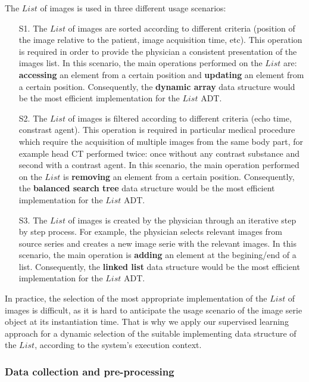 The $List$ of images is used in three different usage scenarios:

\begin{enumerate}

\item [S1.] The $List$ of images are sorted according to different criteria (position of the image relative to the patient, image acquisition time, etc). This operation is required in order to provide the physician a consistent presentation of the images list. In this scenario, the main operations performed on the $List$ are: \textbf{accessing} an element from a certain position and \textbf{updating} an element from a certain position. Consequently, the \textbf{dynamic array} data structure would be the most efficient implementation for the $List$ ADT.

\item [S2.] The $List$ of images is filtered according to different criteria (echo time, constrast agent). This operation is required in particular medical procedure which require the acquisition of multiple images from the same body part, for example head CT performed twice: once without any contrast substance and second with a contrast agent. In this scenario, the main operation performed on the $List$ is \textbf{removing} an element from a certain position. Consequently, the \textbf{balanced search tree} data structure would be the most efficient implementation for the $List$ ADT.

\item [S3.] The $List$ of images is created by the physician through an iterative step by step process. For example, the physician selects relevant images from source series and creates a new image serie with the relevant images. In this scenario, the main operation is \textbf{adding} an element at the begining/end of a list. Consequently, the \textbf{linked list} data structure would be the most efficient implementation for the $List$ ADT.

\end{enumerate}

In practice, the selection of the most appropriate implementation of the $List$ of images is difficult, as it is hard to anticipate the usage scenario of the image serie object at its instantiation time. That is why we apply our supervised learning approach for a dynamic selection of the suitable implementing data structure of the $List$, according to the system's execution context. 

\subsubsection{Data collection and pre-processing}

